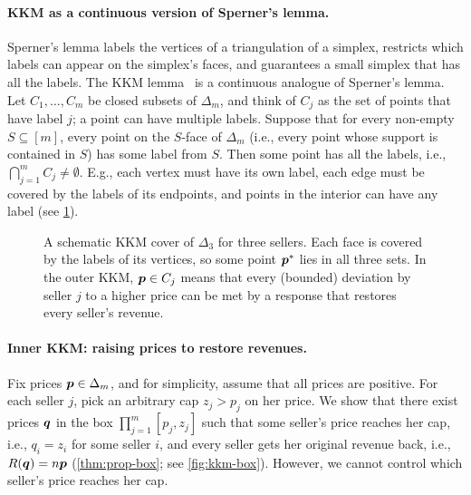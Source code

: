 \paragraph{KKM as a continuous version of Sperner's lemma.}
Sperner's lemma labels the vertices of a triangulation of a simplex,
restricts which labels can appear on the simplex's faces,
and guarantees a small simplex that has all the labels.
The KKM lemma~\cite{KKM1929} is a continuous analogue of Sperner's lemma.
Let $C_1, \ldots, C_m$ be closed subsets of $\Delta_m$,
and think of $C_j$ as the set of points that have label $j$; a point can have multiple labels.
Suppose that for every non-empty $S \subseteq [m]$,
every point on the $S$-face of $\Delta_m$ (i.e., every point whose support is contained in $S$)
has some label from $S$.
Then some point has all the labels, i.e., $\bigcap_{j=1}^m C_j \ne \emptyset$.
E.g., each vertex must have its own label, each edge must be covered by the labels of its endpoints,
and points in the interior can have any label (see \cref{fig:kkm-simplex}).

\begin{figure}[t]
\centering

\caption{A schematic KKM cover of $\Delta_3$ for three sellers.
Each face is covered by the labels of its vertices, so some point $\bm{p}^*$ lies in all three sets.
In the outer KKM, $\bm{p} \in C_j$ means that every (bounded) deviation by seller $j$ to a higher price
can be met by a response that restores every seller's revenue.}
\label{fig:kkm-simplex}
\end{figure}

\paragraph{Inner KKM: raising prices to restore revenues.}
Fix prices $\bm{p} \in \Delta_m$, and for simplicity, assume that all prices are positive.
For each seller $j$, pick an arbitrary cap $z_j > p_j$ on her price.
We show that there exist prices $\bm{q}$ in the box $\prod_{j=1}^m [p_j, z_j]$
such that some seller's price reaches her cap, i.e., $q_i = z_i$ for some seller $i$,
and every seller gets her original revenue back, i.e., $R(\bm{q}) = n\bm{p}$
(\cref{thm:prop-box}; see \cref{fig:kkm-box}).
However, we cannot control which seller's price reaches her cap.

